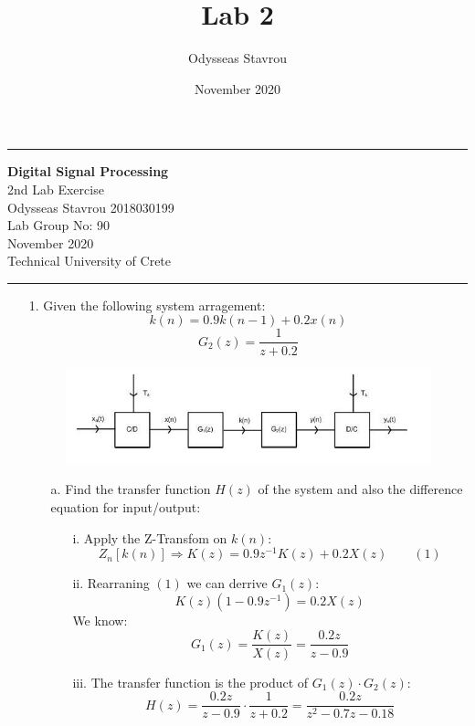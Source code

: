 \documentclass[12pt, a4paper]{article}
\title{Lab 2}
\author{Odysseas Stavrou}
\date{November 2020}
\begin{document}
\noindent\rule{\textwidth}{1.5pt}

\begin{center}
{\bf Digital Signal Processing} \\ 
 2nd Lab Exercise\\
 Odysseas Stavrou 2018030199\\
 Lab Group No: 90\\
 November 2020\\
 Technical University of Crete\\
\end{center}
\noindent\rule{\textwidth}{1.5pt}

\begin{enumerate}
    \item[1.] Given the following system arragement:
    \[k(n) = 0.9k(n-1) + 0.2x(n)\]
    \[G_2(z) = \frac{1}{z + 0.2}\]
    \begin{figure}[H]
        \centering
        \includegraphics[width=\textwidth]{1.png}
    \end{figure}
    \begin{enumerate}
        \item[a.] Find the transfer function \(H(z)\) of the system and also the difference equation
        for input/output:
        \begin{enumerate}
            \item[i.] Apply the Z-Transfom on \(k(n)\):
            \[Z_n[k(n)] \Rightarrow K(z) = 0.9z^{-1}K(z) + 0.2X(z)\qquad(1)\]
            \item[ii.] Rearraning \((1)\) we can derrive \(G_1(z)\):
            \[K(z)(1-0.9z^{-1}) = 0.2X(z)\]
            We know:
            \[G_1(z) = \frac{K(z)}{X(z)} = \boxed{\frac{0.2z}{z-0.9}}\]
            \item[iii.] The transfer function is the product of \(G_1(z)\cdot G_2(z)\):
            \[H(z) = \frac{0.2z}{z-0.9}\cdot \frac{1}{z+0.2} = \boxed{\frac{0.2z}{z^2 - 0.7z - 0.18}}\]


\end{enumerate}
\end{enumerate}
\end{enumerate}
\end{document}
